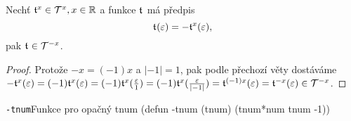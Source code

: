\begin{consequence}\label{dusl:negace_tnumu}
Nechť $\mathfrak{t}^{x}\in\mathcal{T}^{x}, x\in\mathbb{R}$ a funkce $\mathfrak{t}^{}$ má předpis
\begin{equation}
\mathfrak{t}^{}(\varepsilon)=-\mathfrak{t}^{x}(\varepsilon),
\end{equation}
pak $\mathfrak{t}^{}\in\mathcal{T}^{-x}$.
\begin{proof}
Protože $-x = (-1)x$ a $|-1|=1$, pak podle přechozí věty dostáváme $-\mathfrak{t}^{x}(\varepsilon)=(-1)\mathfrak{t}^{x}(\varepsilon)=(-1)\mathfrak{t}^{x}(\frac{\varepsilon}{1})=(-1)\mathfrak{t}^{x}(\frac{\varepsilon}{|-1|})=\mathfrak{t}^{(-1)x}(\varepsilon)=\mathfrak{t}^{-x}(\varepsilon)\in\mathcal{T}^{-x}$.
\end{proof}
\end{consequence}

\begin{lispcode}{\texttt{-tnum}}{Funkce pro opačný tnum}
(\textcolor{funkcionalni}{defun} \textcolor{pojmenovan}{-tnum} (tnum)
  (\textcolor{moje}{tnum*num} tnum -1))
\end{lispcode}

